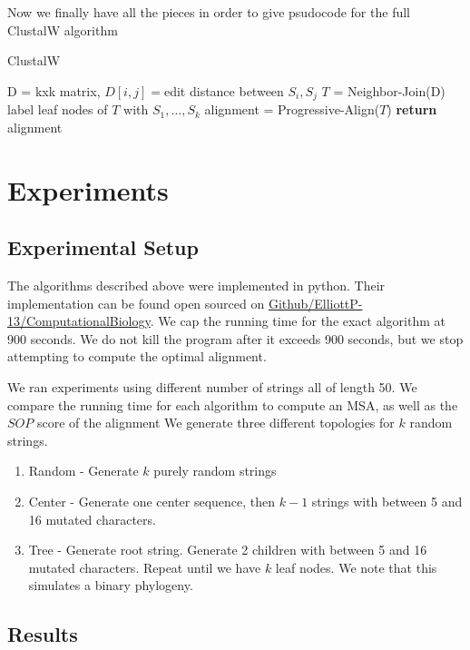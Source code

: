 \documentclass[11pt]{article}
\begin{document}
Now we finally have all the pieces in order to give psudocode for the full ClustalW algorithm

\begin{algorithm}[H]
    \caption{ClustalW}
    \label{alg:nj}
    \begin{algorithmic}[1]
        \State D = kxk matrix, $D[i,j] = $edit distance between $S_i, S_j$
        \State $T$ = Neighbor-Join(D)
        \State label leaf nodes of $T$ with $S_1, \dots, S_k$
        \State alignment = Progressive-Align($T$)
        \State \textbf{return} alignment
    \EndFunction
    \end{algorithmic}
\end{algorithm}

\section{Experiments}
\subsection{Experimental Setup}
The algorithms described above were implemented in python.
Their implementation can be found open sourced on 
\href{https://github.com/ElliottP-13/ComputationalBiology/tree/main/Project}{Github/ElliottP-13/ComputationalBiology}.
We cap the running time for the exact algorithm at 900 seconds. 
We do not kill the program after it exceeds 900 seconds, 
but we stop attempting to compute the optimal alignment.

We ran experiments using different number of strings all of length 50. 
We compare the running time for each algorithm to compute an MSA, as well as the $SOP$ score of the alignment
We generate three different topologies for $k$ random strings.

\begin{enumerate}
    \item Random - Generate $k$ purely random strings
    \item Center - Generate one center sequence, then $k-1$ strings with between 5 and 16 mutated characters.
    \item Tree - Generate root string. Generate 2 children with between 5 and 16 mutated characters. 
    Repeat until we have $k$ leaf nodes.
    We note that this simulates a binary phylogeny.
\end{enumerate}

\subsection{Results}
\end{document}
